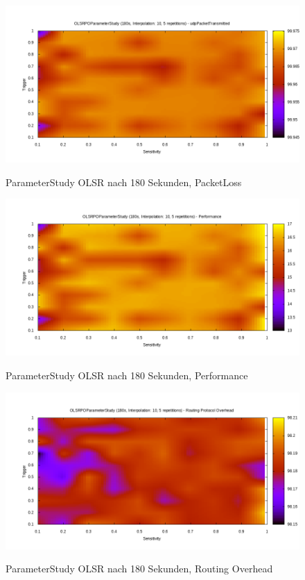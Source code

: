 \begin{figure}
  \centering
  \includegraphics[scale=0.45]{bilder/ops2.png} \\
  \caption{ParameterStudy OLSR nach 180 Sekunden, PacketLoss}
  \label{image:omnet:olsr:two}
\end{figure}

\begin{figure}
  \centering
  \includegraphics[scale=0.45]{bilder/ops3.png} \\
  \caption{ParameterStudy OLSR nach 180 Sekunden, Performance}
  \label{image:omnet:olsr:three}
\end{figure}

\begin{figure}
  \centering
  \includegraphics[scale=0.45]{bilder/ops6.png} \\
  \caption{ParameterStudy OLSR nach 180 Sekunden, Routing Overhead}
  \label{image:omnet:olsr:six}
\end{figure}

